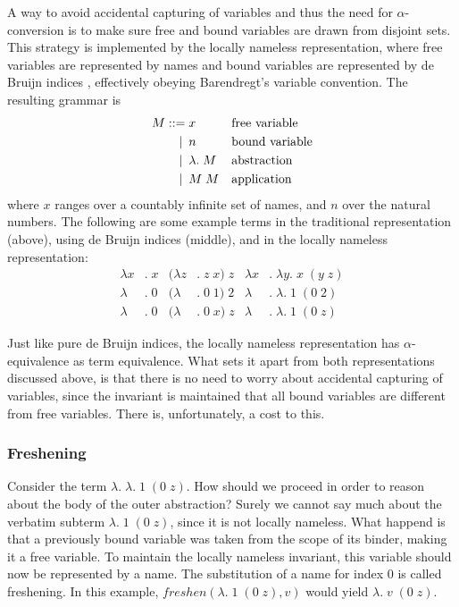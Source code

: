 \documentclass[a4paper,11pt]{article}
\begin{document}
A way to avoid accidental capturing of variables and thus the need for
$\alpha$-conversion is to make sure free and bound variables are drawn
from disjoint sets.
This strategy is implemented by the locally nameless representation,
where free variables are represented by names and bound variables are
represented by de Bruijn indices \cite{McBride-McKinna-04}, effectively
obeying Barendregt's variable convention.
The resulting grammar is
\begin{align*}
  M ::=             &\; x
  && \text{free variable} \\
  \llap{\textbar\:} &\; n
  && \text{bound variable} \\
  \llap{\textbar\:} &\; \lambda . \; M
    && \text{abstraction} \\
  \llap{\textbar\:} &\; M \; M
  && \text{application}
\end{align*}
where $x$ ranges over a countably infinite set of names, and $n$ over
the natural numbers.
The following are some example terms in the traditional representation
(above), using de Bruijn indices (middle), and in the locally nameless
representation:
\begin{align*}
  \lambda x&. \; x & (\lambda z&. \; z \; x) \; z & \lambda x&. \; \lambda y. \; x \; (y \; z)\\
  \lambda &. \; 0  & (\lambda &. \; 0 \; 1) \; 2  & \lambda &. \; \lambda . \; 1 \; (0 \; 2)\\
  \lambda &. \; 0  & (\lambda &. \; 0 \; x) \; z  & \lambda &. \; \lambda . \; 1 \; (0 \; z)
\end{align*}

Just like pure de Bruijn indices, the locally nameless representation
has $\alpha$-equivalence as term equivalence.
What sets it apart from both representations discussed above, is that
there is no need to worry about accidental capturing of variables,
since the invariant is maintained that all bound variables are
different from free variables.
There is, unfortunately, a cost to this.

\subsubsection*{Freshening}

Consider the term $\lambda . \; \lambda . \; 1 \; (0 \; z)$.
How should we proceed in order to reason about the body of the outer
abstraction?
Surely we cannot say much about the verbatim subterm
$\lambda . \; 1 \; (0 \; z)$, since it is not locally nameless.
What happend is that a previously bound variable was taken from the
scope of its binder, making it a free variable.
To maintain the locally nameless invariant, this variable should now be
represented by a name.
The substitution of a name for index $0$ is called freshening.
In this example, $freshen(\lambda . \; 1 \; (0 \; z), v)$ would yield
$\lambda . \; v \; (0 \; z)$.
\end{document}
